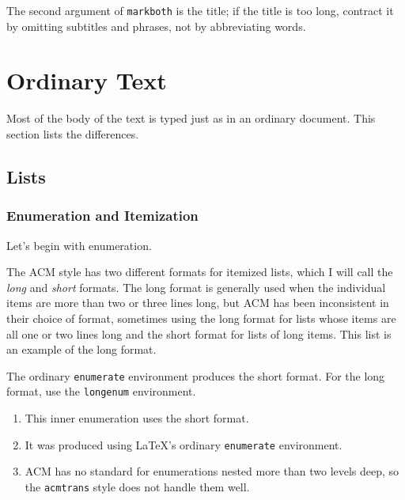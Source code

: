 \documentclass[acmtocl]{acmtrans2m}
\begin{document}
The second argument of \verb|markboth| is the title;
if the title is too long, 
contract it by omitting subtitles and phrases, not by abbreviating 
words.


\section{Ordinary Text}

Most of the body of the text is typed just as in an ordinary
document.  This section lists the differences.

\subsection{Lists}

\subsubsection{Enumeration and Itemization}

Let's begin with enumeration.
\begin{longenum}
\item The ACM style has two different formats for 
itemized lists, which I will call the {\em long\/} and {\em short\/}
formats.  The long format is generally used when the individual items
are more than two or three lines long, but ACM has been inconsistent 
in
their choice of format, sometimes using the long format for lists 
whose
items are all one or two lines long and the short format for lists of
long items.  This list is an example of the long format.

\item The ordinary {\tt enumerate} environment
produces the short format.  For the long format, use the
{\tt longenum} environment.
\begin{enumerate}\itemindent 10pt
\item This inner enumeration uses the short format.
\item It was produced using \LaTeX's ordinary {\tt enumerate}
      environment.
\item ACM has no standard for enumerations nested more than
      two levels deep, so the {\tt acmtrans} style does not
      handle them well.
\end{enumerate}
\end{longenum}
\end{document}
